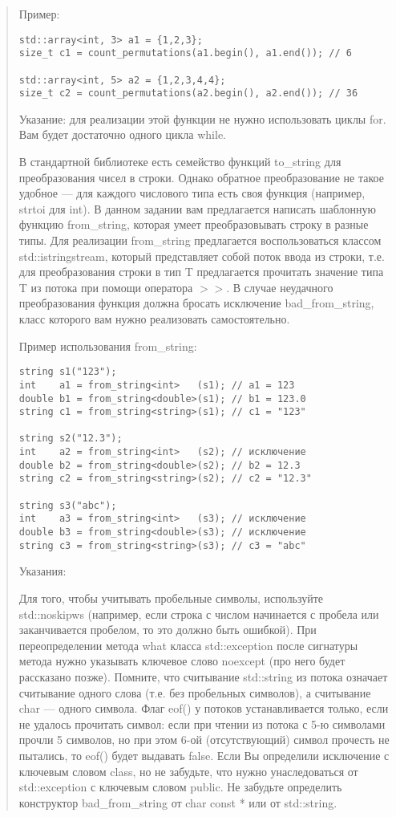 \documentclass[]{article}
\begin{document}
\begin{quote}
Пример:
\begin{verbatim}
std::array<int, 3> a1 = {1,2,3};
size_t c1 = count_permutations(a1.begin(), a1.end()); // 6

std::array<int, 5> a2 = {1,2,3,4,4};
size_t c2 = count_permutations(a2.begin(), a2.end()); // 36
\end{verbatim}

Указание: для реализации этой функции не нужно использовать циклы for. Вам будет достаточно одного цикла while.



В стандартной библиотеке есть семейство функций to\_string для преобразования чисел в строки. Однако обратное преобразование не такое удобное — для каждого числового типа есть своя функция (например, strtoi для int).
В данном задании вам предлагается написать шаблонную функцию from\_string, которая умеет преобразовывать строку в разные типы. Для реализации from\_string предлагается воспользоваться классом std::istringstream, который представляет собой поток ввода из строки, т.е. для преобразования строки в тип T предлагается прочитать значение типа T из потока при помощи оператора $>>$. В случае неудачного преобразования функция должна бросать исключение bad\_from\_string, класс которого вам нужно реализовать самостоятельно.

Пример использования from\_string:
\begin{verbatim}
string s1("123");
int    a1 = from_string<int>   (s1); // a1 = 123
double b1 = from_string<double>(s1); // b1 = 123.0
string c1 = from_string<string>(s1); // c1 = "123"

string s2("12.3");
int    a2 = from_string<int>   (s2); // исключение
double b2 = from_string<double>(s2); // b2 = 12.3
string c2 = from_string<string>(s2); // c2 = "12.3"

string s3("abc");
int    a3 = from_string<int>   (s3); // исключение
double b3 = from_string<double>(s3); // исключение
string c3 = from_string<string>(s3); // c3 = "abc"
\end{verbatim}

Указания:

    Для того, чтобы учитывать пробельные символы, используйте std::noskipws (например, если строка с числом начинается с пробела или заканчивается пробелом, то это должно быть ошибкой).
    При переопределении метода what класса std::exception после сигнатуры метода нужно указывать ключевое слово noexcept (про него будет рассказано позже).
    Помните, что считывание std::string из потока означает считывание одного слова (т.е. без пробельных символов), а считывание char — одного символа.
    Флаг eof() у потоков устанавливается только, если не удалось прочитать символ: если при чтении из потока с 5-ю символами прочли 5 символов, но при этом 6-ой (отсутствующий) символ прочесть не пытались, то eof() будет выдавать false.
    Если Вы определили исключение с ключевым словом class, но не забудьте, что нужно унаследоваться от std::exception с ключевым словом public.
    Не забудьте определить конструктор bad\_from\_string от char const * или от std::string.




\end{quote}
\end{document}
